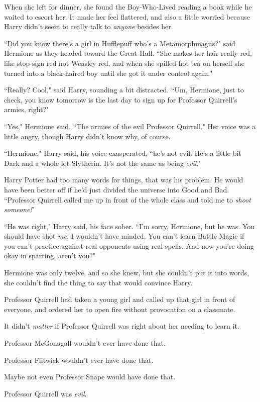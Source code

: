 When she left for dinner, she found the Boy-Who-Lived reading a book while he waited to escort her. It made her feel flattered, and also a little worried because Harry didn't seem to really talk to \emph{anyone} besides her.

``Did you know there's a girl in Hufflepuff who's a Metamorphmagus?" said Hermione as they headed toward the Great Hall. ``She makes her hair really red, like stop-sign red not Weasley red, and when she spilled hot tea on herself she turned into a black-haired boy until she got it under control again."

``Really? Cool," said Harry, sounding a bit distracted. ``Um, Hermione, just to check, you know tomorrow is the last day to sign up for Professor Quirrell's armies, right?"

``Yes," Hermione said. ``The armies of the evil Professor Quirrell." Her voice was a little angry, though Harry didn't know why, of course.

``Hermione," Harry said, his voice exasperated, ``he's not evil. He's a little bit Dark and a whole lot Slytherin. It's not the same as being \emph{evil}."

Harry Potter had too many words for things, that was his problem. He would have been better off if he'd just divided the universe into Good and Bad. ``Professor Quirrell called me up in front of the whole class and told me to \emph{shoot someone!}"

``He was right," Harry said, his face sober. ``I'm sorry, Hermione, but he was. You should have shot \emph{me}, I wouldn't have minded. You can't learn Battle Magic if you can't practice against real opponents using real spells. And now you're doing okay in sparring, aren't you?"

Hermione was only twelve, and so she knew, but she couldn't put it into words, she couldn't find the thing to say that would convince Harry.

Professor Quirrell had taken a young girl and called up that girl in front of everyone, and ordered her to open fire without provocation on a classmate.

It didn't \emph{matter} if Professor Quirrell was right about her needing to learn it.

Professor McGonagall wouldn't ever have done that.

Professor Flitwick wouldn't ever have done that.

Maybe not even Professor Snape would have done that.

Professor Quirrell was \emph{evil}.

